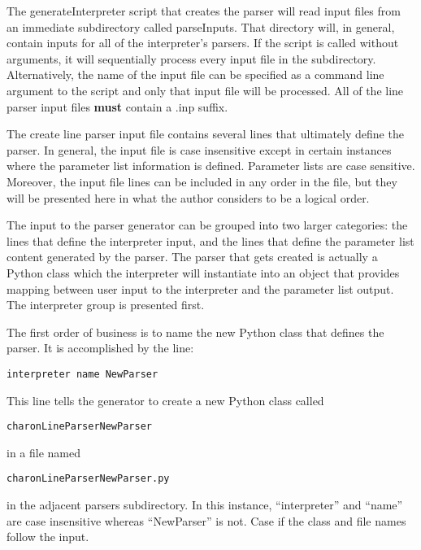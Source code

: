 The generateInterpreter script that creates the parser will read input
files from an immediate subdirectory called parseInputs.  That
directory will, in general, contain inputs for all of the
interpreter's parsers.  If the script is called without arguments, it
will sequentially process every input file in the subdirectory.
Alternatively, the name of the input file can be specified as a
command line argument to the script and only that input file will be
processed.  All of the line parser input files {\bf{must}} contain a
.inp suffix.

The create line parser input file contains several lines that
ultimately define the parser.  In general, the input file is case
insensitive except in certain instances where the parameter list
information is defined.  Parameter lists are case sensitive.
Moreover, the input file lines can be included in any order in the
file, but they will be presented here in what the author considers to
be a logical order.

The input to the parser generator can be grouped into two larger
categories: the lines that define the interpreter input, and the lines
that define the parameter list content generated by the parser.  The
parser that gets created is actually a Python class which the
interpreter will instantiate into an object that provides mapping
between user input to the interpreter and the parameter list output.
The interpreter group is presented first.

The first order of business is to name the new Python class that
defines the parser.  It is accomplished by the line:
\begin{lstlisting}
interpreter name NewParser
\end{lstlisting}
This line tells the generator to create a new Python class
called \begin{lstlisting}charonLineParserNewParser\end{lstlisting} in a
  file
  named \begin{lstlisting}charonLineParserNewParser.py\end{lstlisting} in
  the adjacent parsers subdirectory.  In this instance,
  ``interpreter'' and ``name'' are case insensitive whereas
  ``NewParser'' is not.  Case if the class and file names follow the
  input.

